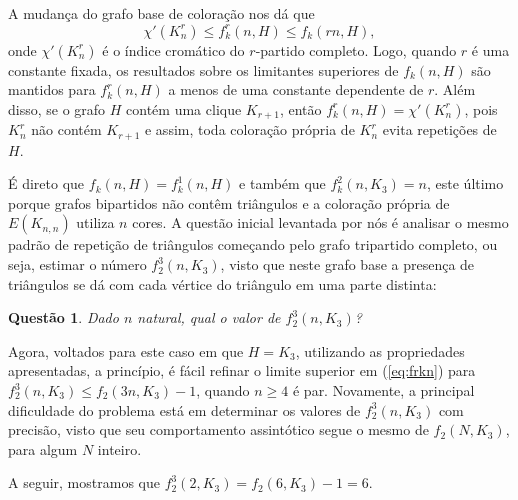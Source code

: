 \documentclass[12pt,a4paper]{book}
\newtheorem{questao}[teorema] {Questão}
\begin{document}
A mudança do grafo base de coloração nos dá que 
%
    \begin{equation}\label{eq:frkn}
        \chi'(K^r_n) \leq f_k^r(n, H) \leq f_k(rn, H),
    \end{equation}
%
onde $\chi'(K^r_n)$ é o índice cromático do $r$-partido completo. 
Logo, quando $r$ é uma constante fixada, os resultados sobre os limitantes superiores de $f_k(n,H)$ são mantidos para $f_k^r(n,H)$ a menos de uma constante dependente de $r$.
Além disso, se o grafo $H$ contém uma clique $K_{r+1}$, então ${f_k^r(n, H) = \chi'(K^r_n)}$, pois $K^r_n$ não contém $K_{r+1}$ e assim, toda coloração própria de $K_n^r$ evita repetições de $H$.

É direto que $f_k(n,H) = f_k^1(n,H)$ e também que $f_k^2(n, K_3)= n$, este último porque grafos bipartidos não contêm triângulos e a coloração própria de $E(K_{n,n})$ utiliza $n$ cores. 
A questão inicial levantada por nós é analisar o mesmo padrão de repetição de triângulos começando pelo grafo tripartido completo, ou seja, estimar o número $f_2^3(n, K_3)$, visto que neste grafo base a presença de triângulos se dá com cada vértice do triângulo em uma parte distinta:

\begin{questao}\label{q:tripartido}
    Dado $n$ natural, qual o valor de $f_2^3(n, K_3)$?
\end{questao}

Agora, voltados para este caso em que $H=K_3$, utilizando as propriedades apresentadas,
a princípio, é fácil refinar o limite superior em (\ref{eq:frkn}) para $f_2^3(n,K_3) \leq f_2(3n, K_3)-1$, quando $n \geq 4$ é par.
Novamente, a principal dificuldade do problema está em determinar os valores de $f_2^3(n, K_3)$ com precisão, visto que seu comportamento assintótico segue o mesmo de $f_2(N, K_3)$, para algum $N$ inteiro.

A seguir, mostramos que $f_2^3(2, K_3) = f_2(6,K_3) - 1= 6$.
\end{document}
